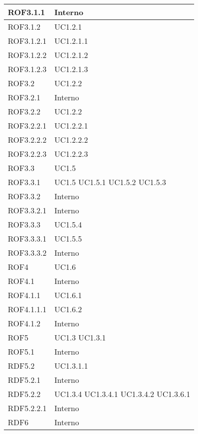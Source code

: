 \begin{center}
\begin{longtable}{| p{4cm} | p{4cm} |}
	\hline
	ROF3.1.1  &  Interno \\
	\hline
	ROF3.1.2  &  UC1.2.1 \\
	\hline
	ROF3.1.2.1  &  UC1.2.1.1 \\
	\hline
	ROF3.1.2.2  &  UC1.2.1.2 \\
	\hline
	ROF3.1.2.3  &  UC1.2.1.3 \\
	\hline
	ROF3.2  &  UC1.2.2  \\
	\hline
	ROF3.2.1  &  Interno \\
	\hline
	ROF3.2.2  &  UC1.2.2 \\
	\hline
	ROF3.2.2.1  &  UC1.2.2.1 \\
	\hline
	ROF3.2.2.2  &  UC1.2.2.2 \\
	\hline
	ROF3.2.2.3  &  UC1.2.2.3 \\
	\hline				
	ROF3.3  &  UC1.5 \\
	\hline
	ROF3.3.1  &  UC1.5 \newline UC1.5.1 \newline UC1.5.2 \newline UC1.5.3 \\
	\hline
	ROF3.3.2  &  Interno \\
	\hline
	ROF3.3.2.1  &  Interno \\
	\hline
	ROF3.3.3  &  UC1.5.4 \\
	\hline
	ROF3.3.3.1  &  UC1.5.5 \\
	\hline
	ROF3.3.3.2  &  Interno \\
	\hline
	ROF4  &  UC1.6 \\
	\hline
	ROF4.1  &  Interno \\
	\hline
	ROF4.1.1  &  UC1.6.1 \\
	\hline
	ROF4.1.1.1  &  UC1.6.2 \\
	\hline
	ROF4.1.2  &  Interno \\
	\hline
	ROF5  &  UC1.3 \newline UC1.3.1 \\
	\hline
	ROF5.1  &  Interno \\
	\hline
	RDF5.2  &  UC1.3.1.1 \\
	\hline
	RDF5.2.1  &  Interno \\
	\hline
	RDF5.2.2  &  UC1.3.4 \newline UC1.3.4.1 \newline UC1.3.4.2 \newline UC1.3.6.1 \\
	\hline
	RDF5.2.2.1  &  Interno \\
	\hline
	RDF6  &  Interno \\

\end{longtable}
\end{center}
